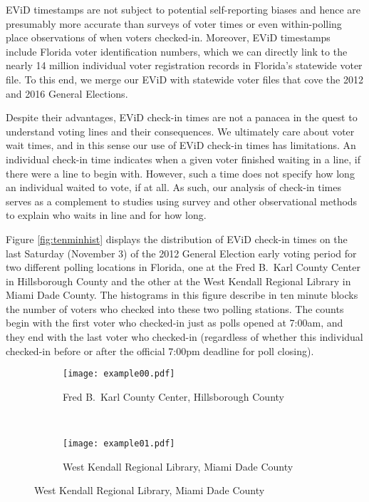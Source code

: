 \documentclass[12pt,titlepage]{article}
\begin{document}
EViD timestamps are not subject to potential self-reporting biases and
hence are presumably more accurate than surveys of voter times or even
within-polling place observations of when voters checked-in.
Moreover, EViD timestamps include Florida voter identification
numbers, which we can directly link to the nearly 14 million
individual voter registration records in Florida's statewide voter
file.  To this end, we merge our EViD with statewide voter files that
cove the 2012 and 2016 General Elections.


Despite their advantages, EViD check-in times are not a panacea in the
quest to understand voting lines and their consequences.  We
ultimately care about voter wait times, and in this sense our use of
EViD check-in times has limitations.  An individual check-in time
indicates when a given voter finished waiting in a line, if there were
a line to begin with.  However, such a time does not specify how long
an individual waited to vote, if at all. As such, our analysis of
check-in times serves as a complement to studies using survey and
other observational methods to explain who waits in line and for how
long.

Figure \ref{fig:tenminhist} displays the distribution of EViD check-in
times on the last Saturday (November 3) of the 2012 General Election
early voting period for two different polling locations in Florida,
one at the Fred B.\ Karl County Center in Hillsborough County and the
other at the West Kendall Regional Library in Miami Dade County.  The
histograms in this figure describe in ten minute blocks the number of
voters who checked into these two polling stations.  The counts begin
with the first voter who checked-in just as polls opened at 7:00am,
and they end with the last voter who checked-in (regardless of whether
this individual checked-in before or after the official 7:00pm
deadline for poll closing).

\begin{figure}[!ht]
  \caption{Early voting check-in times on Saturday, November 3, 2012, in two Florida locations}
  \label{fig:tenminhist}
  \centering
  \begin{subfigure}[b]{\linewidth}
    \centering\texttt{[image: example00.pdf]}
    \caption{Fred B.\ Karl County Center, Hillsborough County}
    \label{fig:karlexample}
  \end{subfigure}%
  \\
  \begin{subfigure}[b]{\linewidth}
    \centering\texttt{[image: example01.pdf]}
    \caption{West Kendall Regional Library, Miami Dade County}
    \label{fig:kendallexample}
  \end{subfigure}
\end{figure}
\end{document}

